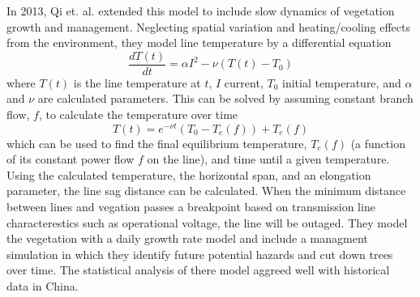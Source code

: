 In 2013, Qi et. al. extended this model to include slow dynamics of vegetation growth and management.  Neglecting spatial variation and heating/cooling effects from   the environment, they model line temperature by a differential equation
\begin{equation}
\frac{dT(t)}{dt} = \alpha I^2 - \nu (T(t) - T_0)
\end{equation}
where $T(t)$ is the line temperature at $t$, $I$ current, $T_0$ initial temperature, and $\alpha$ and $\nu$ are calculated parameters.  This can be solved by assuming constant branch flow, $f$, to calculate the temperature over time
\begin{equation}
T(t) = e^{-\nu t}\left( T_0 - T_e(f) \right) + T_e(f)
\end{equation}
which can be used to find the final equilibrium temperature, $T_e(f)$ (a function of its constant power flow $f$ on the line), and time until a given temperature.  Using the calculated temperature, the horizontal span, and an elongation parameter, the line sag distance can be calculated.  When the minimum distance between lines and vegation passes a breakpoint based on transmission line characterestics such as operational voltage, the line will be outaged.  They model the vegetation with a daily growth rate model and include a managment simulation in which they identify future potential hazards and cut down trees over time.  The statistical analysis of there model aggreed well with historical data in China.

